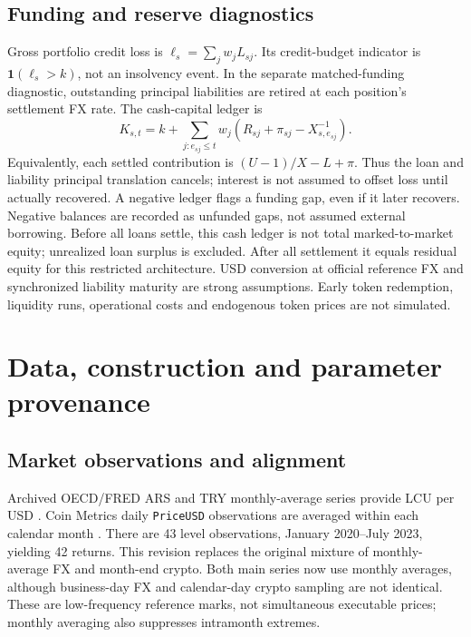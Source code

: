 \documentclass[11pt,a4paper]{article}
\newcommand{\ind}{\mathbf{1}}
\begin{document}
\subsection{Funding and reserve diagnostics}
Gross portfolio credit loss is $\ell_s=\sum_j w_jL_{sj}$. Its credit-budget indicator is $\ind(\ell_s>k)$, not an insolvency event. In the separate matched-funding diagnostic, outstanding principal liabilities are retired at each position's settlement FX rate. The cash-capital ledger is
\begin{equation}
K_{s,t}=k+\sum_{j:e_{sj}\leq t}w_j\left(R_{sj}+\pi_{sj}-X_{s,e_{sj}}^{-1}\right).
\end{equation}
Equivalently, each settled contribution is $(U-1)/X-L+\pi$. Thus the loan and liability principal translation cancels; interest is not assumed to offset loss until actually recovered. A negative ledger flags a funding gap, even if it later recovers. Negative balances are recorded as unfunded gaps, not assumed external borrowing. Before all loans settle, this cash ledger is not total marked-to-market equity; unrealized loan surplus is excluded. After all settlement it equals residual equity for this restricted architecture. USD conversion at official reference FX and synchronized liability maturity are strong assumptions. Early token redemption, liquidity runs, operational costs and endogenous token prices are not simulated.

\section{Data, construction and parameter provenance}
\subsection{Market observations and alignment}
Archived OECD/FRED ARS and TRY monthly-average series provide LCU per USD \cite{FREDARS,FREDTRY}. Coin Metrics daily \texttt{PriceUSD} observations are averaged within each calendar month \cite{CoinMetricsData}. There are 43 level observations, January 2020--July 2023, yielding 42 returns. This revision replaces the original mixture of monthly-average FX and month-end crypto. Both main series now use monthly averages, although business-day FX and calendar-day crypto sampling are not identical. These are low-frequency reference marks, not simultaneous executable prices; monthly averaging also suppresses intramonth extremes.
\end{document}
